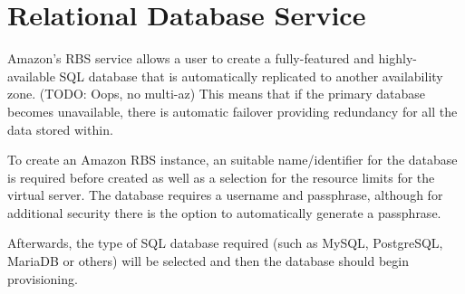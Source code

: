 \chapter{Relational Database Service}
Amazon’s RBS service allows a user to create a fully-featured and highly-available SQL database that is automatically replicated to another availability zone. (TODO: Oops, no multi-az) This means that if the primary database becomes unavailable, there is automatic failover providing redundancy for all the data stored within.

To create an Amazon RBS instance, an suitable name/identifier for the database is required before created as well as a selection for the resource limits for the virtual server. The database requires a username and passphrase, although for additional security there is the option to automatically generate a passphrase.

Afterwards, the type of SQL database required (such as MySQL, PostgreSQL, MariaDB or others) will be selected and then the database should begin provisioning.